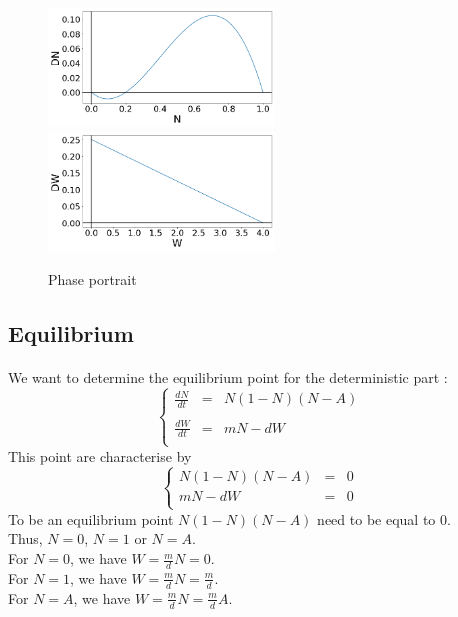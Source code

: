 \documentclass{article}
\begin{document}
\begin{figure}[h!]
\centering
\includegraphics[width=6cm]{phase_N.png}
\includegraphics[width=6cm]{phase_W.png}
\caption{Phase portrait}
\end{figure}







\subsection{Equilibrium}
\label{equi}
\paragraph{}
We want to determine the equilibrium point for the deterministic part :
\[
\left\lbrace
\begin{array}{rcl}
\frac{dN}{dt} & = & N(1-N)(N-A) \\
\\
\frac{dW}{dt} & = & mN -dW \\
\end{array}
\right.
\]
This point are characterise by
\[
\left\lbrace
\begin{array}{rcl}
N(1-N)(N-A) & = & 0\\
mN -dW & = & 0\\
\end{array}
\right.
\]
To be an equilibrium point $N(1-N)(N-A)$ need to be equal to $0$. \\
Thus, $N = 0$, $N = 1$ or $N = A$. \\
For $N = 0$, we have $W = \frac{m}{d}N = 0$. \\
For $N = 1$, we have $W = \frac{m}{d}N = \frac{m}{d}$. \\
For $N = A$, we have $W = \frac{m}{d}N = \frac{m}{d}A$. \\
\end{document}
